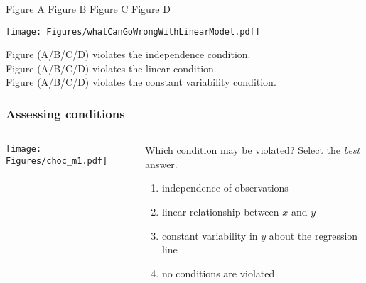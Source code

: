 \begin{frame}
\begin{center}
Figure A \hspace{0.4in} Figure B  \hspace{0.4in} Figure C \hspace{0.4in} Figure D
\end{center}
\texttt{[image: Figures/whatCanGoWrongWithLinearModel.pdf]}\\
\vskip20pt
\begin{clicker}{Figure (A/B/C/D) violates the independence condition.\\
 Figure (A/B/C/D) violates the linear condition.\\
  Figure (A/B/C/D) violates the constant variability condition.}
\end{clicker}
\end{frame}




\begin{frame}
\frametitle{Assessing conditions}
\begin{columns}
\begin{center}
\texttt{[image: Figures/choc\_m1.pdf]}\\
\end{center}
\begin{clicker}{Which condition may be violated?  Select the \emph{best} answer.}
\begin{enumerate}
    \item
    independence of observations
    \item
    linear relationship between $x$ and $y$
    \item
    constant variability in $y$ about the regression line
    \item
    no conditions are violated
\end{enumerate}
\end{clicker}
\end{columns}
\end{frame}

